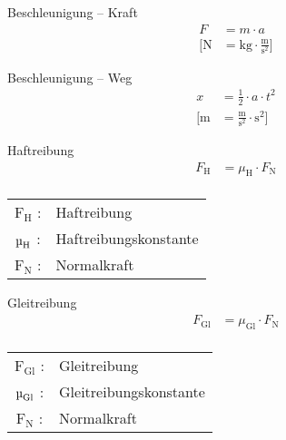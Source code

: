 %


\begin{karte}{Beschleunigung -- Kraft}
    \begin{align*}
        F &= m \cdot a \\
        [\text{N} &= \text{kg} \cdot 
            \frac{\text{m}}{\text{s}^2}
        ]
    \end{align*}
\end{karte}

\begin{karte}{Beschleunigung -- Weg}
    \begin{align*}
        x &= \frac{1}{2} \cdot a \cdot t^2 \\
        [
            \text{m} &=
            \frac{\text{m}}{\text{s}^2}
            \cdot \text{s}^2 ]
    \end{align*}
\end{karte}

\begin{karte}{Haftreibung}
    \begin{align*}
        F_\text{H} &= \mu_\text{H} \cdot F_\text{N} \\
    \end{align*}
    \begin{center}
    \begin{tabular}[t]{cl}
        \(\text{F}_\text{H}\) :& Haftreibung\\
        \(\text{\textmu}_\text{H}\) :& Haftreibungskonstante \\
        \(\text{F}_\text{N}\) :& Normalkraft \\
    \end{tabular}
    \end{center}
\end{karte}

\begin{karte}{Gleitreibung}
    \begin{align*}
        F_\text{Gl} &= \mu_\text{Gl} \cdot F_\text{N} \\
    \end{align*}
    \begin{center}
    \begin{tabular}[t]{cl}
        \(\text{F}_\text{Gl}\) :& Gleitreibung\\
        \(\text{\textmu}_\text{Gl}\) :& Gleitreibungskonstante \\
        \(\text{F}_\text{N}\) :& Normalkraft \\
    \end{tabular}
    \end{center}
\end{karte}

